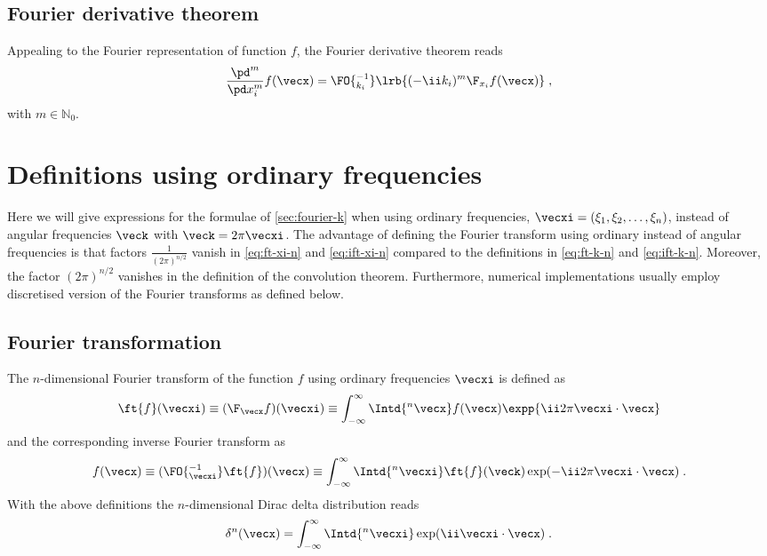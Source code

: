 \documentclass[
twoside,
openright,
titlepage,
numbers=noenddot,
headinclude,
fleqn,
a4paper,
footinclude=true,
cleardoublepage=empty,
abstractoff,
BCOR=5mm,
paper=a4,
fontsize=11pt,
british,ngerman,american,
]{scrreprt}
\begin{document}
\subsection{Fourier derivative theorem}
\label{sec:fourier-derivative-k-n}

Appealing to the Fourier representation of function $f$, the Fourier
derivative theorem reads
\begin{equation}
  \label{eq:fdt-k-n}
  \frac{\pd^m}{\pd x_i^m} f(\vecx) = 
    \FO{^{-1}_{k_i}}\lrb{ (-\ii k_i)^m \F_{x_i} f(\vecx) } \;,
\end{equation}
with $m\in\mathbb{N}_0$.

\section{Definitions using ordinary frequencies}
\label{sec:fourier-xi}

Here we will give expressions for the formulae of \cref{sec:fourier-k}
when using ordinary frequencies, $\vecxi=(\xi_1,\xi_2,\dots,\xi_n)$,
instead of angular frequencies $\veck$ with $\veck=2\pi\vecxi$.  The
advantage of defining the Fourier transform using ordinary instead of
angular frequencies is that factors $\frac{1}{(2\pi)^{n/2}}$ vanish in
\cref{eq:ft-xi-n} and \cref{eq:ift-xi-n} compared to the definitions
in \cref{eq:ft-k-n} and \cref{eq:ift-k-n}.  Moreover, the factor
$(2\pi)^{n/2}$ vanishes in the definition of the convolution theorem.
Furthermore, numerical implementations usually employ discretised
version of the Fourier transforms as defined below.

\subsection{Fourier transformation}
\label{sec:ft-xi}

The $n$-dimensional Fourier transform of the function $f$ using
ordinary frequencies $\vecxi$ is defined as
\begin{equation}
  \label{eq:ft-xi-n}
  \ft{f}(\vecxi) \equiv (\F_\vecx f)(\vecxi) \equiv
  \int_{-\infty}^\infty \Intd{^n\vecx} 
  f(\vecx) \expp{\ii2\pi\vecxi\cdot\vecx}
\end{equation}
and the corresponding inverse Fourier transform as
\begin{equation}
  \label{eq:ift-xi-n}
  f(\vecx) \equiv (\FO{^{-1}_\vecxi} \ft{f})(\vecx) \equiv
  \int_{-\infty}^\infty \Intd{^n\vecxi} 
  \ft{f}(\veck) \exp(-\ii2\pi\vecxi\cdot\vecx) \;.
\end{equation}
With the above definitions the $n$-dimensional Dirac
delta distribution reads
\begin{equation}
  \label{eq:dirac-xi-n}
  \delta^n(\vecx)  = 
  \int_{-\infty}^\infty \Intd{^n\vecxi} 
   \exp(\ii\vecxi\cdot\vecx) \;.
\end{equation}
\end{document}
